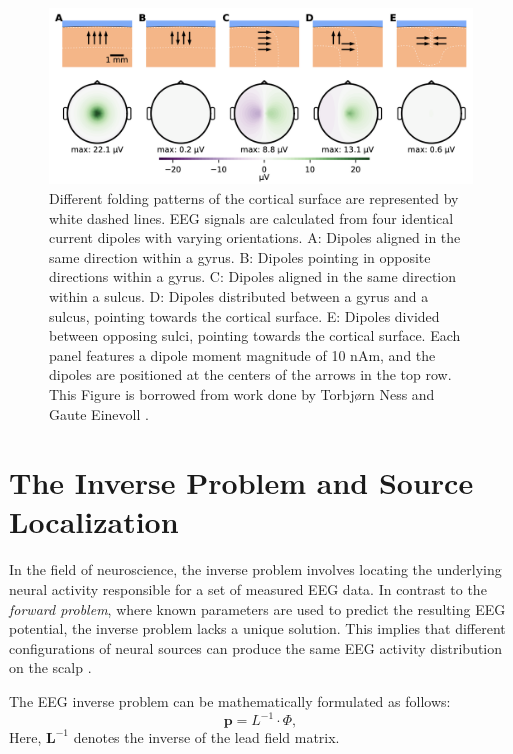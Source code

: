 \documentclass[a4paper, UKenglish, 11pt]{uiomaster}
\begin{document}
\begin{figure}[!htb]
    \centering
    \includegraphics[width=\linewidth]{figures/dipole_orientation.png}
    \caption{Different folding patterns of the cortical surface are represented by white dashed lines. EEG signals are calculated from four identical current dipoles with varying orientations. A: Dipoles aligned in the same direction within a gyrus. B: Dipoles pointing in opposite directions within a gyrus. C: Dipoles aligned in the same direction within a sulcus. D: Dipoles distributed between a gyrus and a sulcus, pointing towards the cortical surface. E: Dipoles divided between opposing sulci, pointing towards the cortical surface.
    Each panel features a dipole moment magnitude of 10 nAm, and the dipoles are positioned at the centers of the arrows in the top row. This Figure is borrowed from work done by Torbjørn Ness and Gaute Einevoll \cite{naess2021biophysically}.}
    \label{fig:dipole_orientation}
\end{figure}



\section{The Inverse Problem and Source Localization}
In the field of neuroscience, the inverse problem involves locating the underlying neural activity responsible for a set of measured EEG data. In contrast to the \emph{forward problem}, where known parameters are used to predict the resulting EEG potential, the inverse problem lacks a unique solution. This implies that different configurations of neural sources can produce the same EEG activity distribution on the scalp \cite{hecker2021convdip}.

The EEG inverse problem can be mathematically formulated as follows:
\begin{equation}
\mathbf{p} = {L}^{-1} \cdot {\Phi},
\label{eq:inverse_problem}
\end{equation}
Here, \(\mathbf{L}^{-1}\) denotes the inverse of the lead field matrix.
\end{document}
